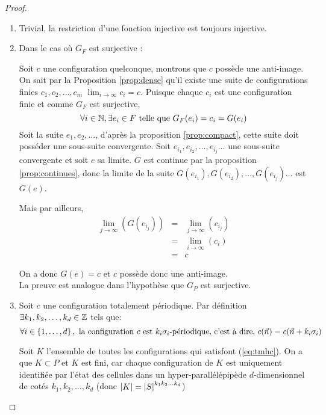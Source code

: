 \begin{proof}

	\begin{enumerate}
		\item Trivial, la restriction d'une fonction injective est toujours injective.
		\item Dans le cas où $G_F$ est surjective :

		      Soit $c$ une configuration quelconque, montrons que $c$ possède une anti-image. 
		      On sait par la Proposition \ref{prop:dense} qu'il existe
		      une suite de configurations finies $c_1, c_2, \ldots , c_m$ \tlq $\lim_{i \to \infty} c_i = c$.
		      Puisque chaque $c_i$ est une configuration finie et comme $G_F$ est surjective,
		      $$\forall i\in \mathbb{N},  \exists e_i \in F \mbox{ telle que } G_F(e_i) = c_i = G(e_i)$$
		      Soit la suite $e_1, e_2, \ldots $, d'après la proposition  \ref{prop:compact}, 
		      cette suite doit posséder une  sous-suite convergente. Soit $ e_{i_1}, e_{i_2}, \ldots , e_{i_j} \ldots$ une 
		      sous-suite convergente et soit  $e$ sa limite.
		      $G$ est continue par la proposition \ref{prop:continues}, donc la limite de la suite 
		      $G(e_{i_1}), G(e_{i_2}), \ldots , G(e_{i_j}) \ldots$ est   $G(e)$.

		      Mais par ailleurs,
		      \begin{eqnarray*}
			      \lim_{j \to \infty} (G(e_{i_j})) &=& \lim_{j \to \infty} (c_{i_j}) \\
			      &=& \lim_{i \to \infty} (c_i) \\
			      &=& c
		      \end{eqnarray*}

		      On a donc $G(e) = c$ et $c$ possède donc une anti-image.\\
		      La preuve est analogue dans l'hypothèse que $G_P$ est surjective.
		\item Soit $c$ une configuration totalement périodique. Par définition
		      $\exists k_1, k_2, \ldots, k_d \in \mathbb{Z}$ tels que:
		      \begin{equation}
			      \forall i \in \left\{1,\ldots,d\right\}, \ \text{la configuration }  c \text{ est } {k_i}\sigma_i\text{-périodique,} 
			      \text{ c'est à dire, }
			      c(\vec n) = c(\vec n +  k_i \sigma_i)
			      \label{eq:tmhc}
		      \end{equation}

		      Soit $K$ l'ensemble de toutes les configurations qui satisfont (\ref{eq:tmhc}). On a que $K \subset P$ et $K$ est fini,
		      car chaque configuration de $K$ est uniquement identifiée par l'état des cellules dans un 
		      hyper-parallélépipède $d$-dimensionnel de cotés $k_1, k_2, \ldots, k_d$
		      (donc $\left|K\right| = {\left|S\right|}^{k_1k_2\ldots k_d}$)


\end{enumerate}
\end{proof}
